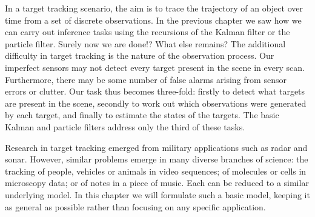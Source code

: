 In a target tracking scenario, the aim is to trace the trajectory of an object over time from a set of discrete observations. In the previous chapter we saw how we can carry out inference tasks using the recursions of the Kalman filter or the particle filter. Surely now we are done!? What else remains? The additional difficulty in target tracking is the nature of the observation process. Our imperfect sensors may not detect every target present in the scene in every scan. Furthermore, there may be some number of false alarms arising from sensor errors or clutter. Our task thus becomes three-fold: firstly to detect what targets are present in the scene, secondly to work out which observations were generated by each target, and finally to estimate the states of the targets. The basic Kalman and particle filters address only the third of these tasks.

Research in target tracking emerged from military applications such as radar and sonar. However, similar problems emerge in many diverse branches of science: the tracking of people, vehicles or animals in video sequences; of molecules or cells in microscopy data; or of notes in a piece of music. Each can be reduced to a similar underlying model. In this chapter we will formulate such a basic model, keeping it as general as possible rather than focusing on any specific application.
